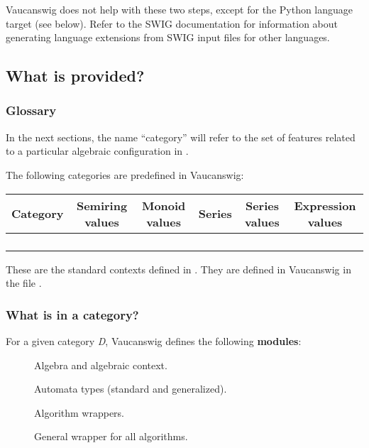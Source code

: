 Vaucanswig does not help with these two steps,
except for the Python language target (see below).  Refer to the SWIG
documentation for information about generating language extensions
from SWIG input files for other languages.

\subsection{What is provided?}

\subsubsection{Glossary}

In the next sections, the name ``category'' will refer to the set of
features related to a particular algebraic configuration in \Vauc.

The following categories are predefined in Vaucanswig:

\begin{center}
\begin{tabular}{*{6}{|c}|}
\hline
Category            & Semiring values  & Monoid values  & Series          &Series values  & Expression values\\
\hline
{}        &       &   & \SerSAnMon{\B}{\Ae} & &   \\
    &        &   & \SerSAnMon{\Z}{\Ae} & &   \\
 &       &   & \SerSAnMon{\Z(\min,+)}{\Ae}& &   \\
 &       &   & \SerSAnMon{\Z(\max,+)}{\Ae}& &   \\
\hline
\end{tabular}
\end{center}

These are the standard contexts defined in \Vauc. They are defined
in Vaucanswig in the file .

\subsubsection{What is in a category?}

For   a  given   category  \emph{D},   Vaucanswig  defines   the  following
\textbf{modules}:

\begin{description}
\item[] Algebra and algebraic context.
\item[] Automata types (standard and
  generalized).
\item[]  Algorithm wrappers.
\item[] General wrapper for all
  algorithms.
\end{description}

